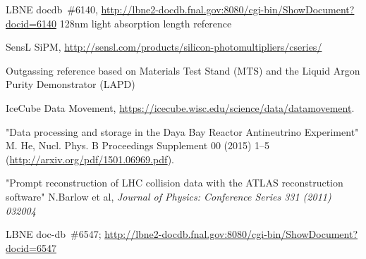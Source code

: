 \begin{thebibliography}{99}
 LBNE docdb~\#6140, \url{http://lbne2-docdb.fnal.gov:8080/cgi-bin/ShowDocument?docid=6140}
 128nm light absorption length reference


 SensL SiPM, \url{http://sensl.com/products/silicon-photomultipliers/cseries/}


%
%




 Outgassing reference based on Materials Test Stand (MTS) and the Liquid Argon Purity Demonstrator (LAPD)

%
%

%
%

%
%

 IceCube Data Movement, \url{https://icecube.wisc.edu/science/data/datamovement}.

"Data processing and storage in the Daya Bay Reactor Antineutrino Experiment" M. He, Nucl. Phys. B Proceedings Supplement 00 (2015) 1–5 (\url{http://arxiv.org/pdf/1501.06969.pdf}).

 "Prompt reconstruction of LHC collision data with the ATLAS reconstruction software" N.Barlow et al, \textit{Journal of Physics: Conference Series 331 (2011) 032004}

%
%
 
%
%
 LBNE doc-db~\#6547; \url{http://lbne2-docdb.fnal.gov:8080/cgi-bin/ShowDocument?docid=6547}

%
%


\end{thebibliography}
